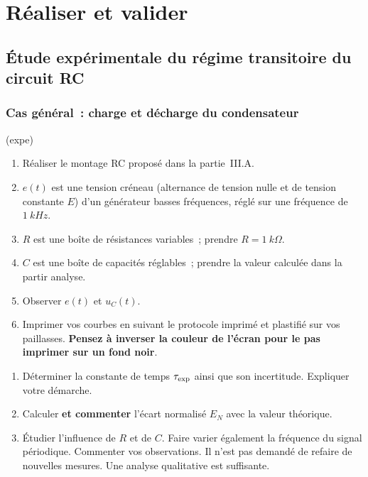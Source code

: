 \documentclass[../main/main.tex]{subfiles}
\begin{document}
\section{Réaliser et valider}
\subsection{Étude expérimentale du régime transitoire du circuit RC}

\subsubsection{Cas général~: charge et décharge du condensateur}

\begin{tcb}(expe){}
	\begin{enumerate}
		\item Réaliser le montage RC proposé dans la partie~III.A.
		\item $e(t)$ est une tension créneau (alternance de tension nulle et de
		      tension constante $E$) d'un générateur basses fréquences, réglé sur une
		      fréquence de $\SI{1}{kHz}$.
		\item $R$ est une boîte de résistances variables~; prendre $R =
			      \SI{1}{k\Omega}$.
		\item $C$ est une boîte de capacités réglables~; prendre la valeur calculée
		      dans la partir analyse.
		\item Observer $e(t)$ et $u_{C}(t)$.
		\item Imprimer vos courbes en suivant le protocole imprimé et plastifié sur
		      vos paillasses. \textbf{Pensez à inverser la couleur de l'écran pour
			      le pas imprimer sur un fond noir}.
	\end{enumerate}
\end{tcb}

\begin{enumerate}[label=\sqenumi]
	\item Déterminer la constante de temps $\tau_{\rm exp}$ ainsi que son
	      incertitude. Expliquer votre démarche.
	\item Calculer \textbf{et commenter} l'écart normalisé $E_N$ avec la valeur
	      théorique.
	\item Étudier l'influence de $R$ et de $C$. Faire varier également la
	      fréquence du signal périodique. Commenter vos observations. Il n'est pas
	      demandé de refaire de nouvelles mesures. Une analyse qualitative est
	      suffisante.
\end{enumerate}
\end{document}
